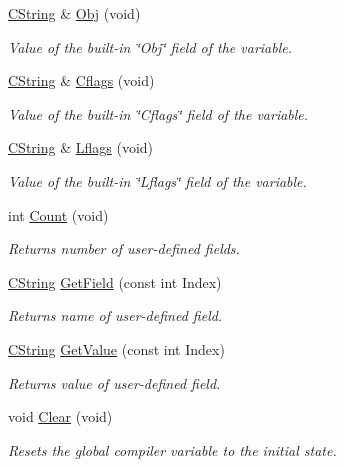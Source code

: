 \begin{DoxyCompactItemize}
\hyperlink{classCString}{C\-String} \& \hyperlink{classCGlobalVariable_aee635a839635b27b1368b4f0db4d3a66}{Obj} (void)
\begin{DoxyCompactList}\small\item\em Value of the built-\/in \char`\"{}\-Obj\char`\"{} field of the variable. \end{DoxyCompactList}\item 
\hyperlink{classCString}{C\-String} \& \hyperlink{classCGlobalVariable_a821dc587f962c31dddf011fb6a0f2844}{Cflags} (void)
\begin{DoxyCompactList}\small\item\em Value of the built-\/in \char`\"{}\-Cflags\char`\"{} field of the variable. \end{DoxyCompactList}\item 
\hyperlink{classCString}{C\-String} \& \hyperlink{classCGlobalVariable_a3c456bc6db79d58a9e0f02c43e31bb7d}{Lflags} (void)
\begin{DoxyCompactList}\small\item\em Value of the built-\/in \char`\"{}\-Lflags\char`\"{} field of the variable. \end{DoxyCompactList}\item 
int \hyperlink{classCGlobalVariable_aec353078fad015a6ebba488f11284fd2}{Count} (void)
\begin{DoxyCompactList}\small\item\em Returns number of user-\/defined fields. \end{DoxyCompactList}\item 
\hyperlink{classCString}{C\-String} \hyperlink{classCGlobalVariable_ac5b28d50dfcb1ef7151809c7aa5803d4}{Get\-Field} (const int Index)
\begin{DoxyCompactList}\small\item\em Returns name of user-\/defined field. \end{DoxyCompactList}\item 
\hyperlink{classCString}{C\-String} \hyperlink{classCGlobalVariable_ae9ea3bf58582375986c1a36262299e0f}{Get\-Value} (const int Index)
\begin{DoxyCompactList}\small\item\em Returns value of user-\/defined field. \end{DoxyCompactList}\item 
void \hyperlink{classCGlobalVariable_a32fc9ddac4defdd28a04dd9072f487c5}{Clear} (void)
\begin{DoxyCompactList}\small\item\em Resets the global compiler variable to the initial state. \end{DoxyCompactList}\item 

\end{DoxyCompactItemize}
